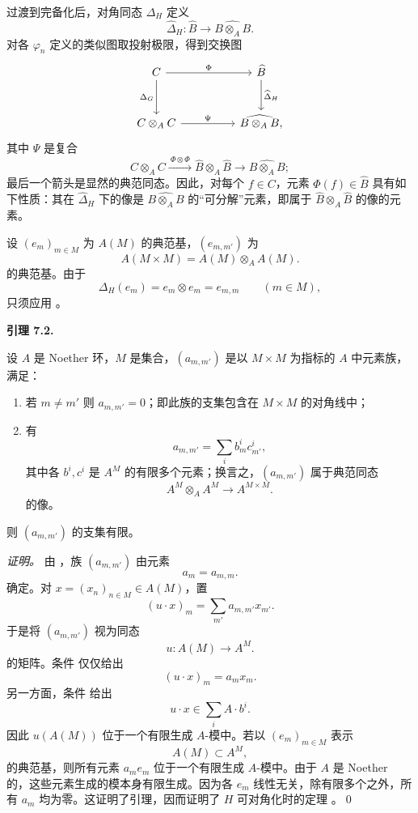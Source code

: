 过渡到完备化后，对角同态 \(\Delta_H\) 定义
\[
  \widehat\Delta_H:
  \widehat B\longrightarrow\widehat{B\otimes_AB}.
\]
对各 \(\varphi_n\) 定义的类似图取投射极限，得到交换图
\[
\begin{tikzcd}[column sep=huge,row sep=large]
  C
    \arrow[r,"\Phi"]
    \arrow[d,"\Delta_G"']
  & \widehat B
    \arrow[d,"\widehat\Delta_H"]
  \\
  C\otimes_A C
    \arrow[r,"\Psi"]
  & \widehat{B\otimes_A B},
\end{tikzcd}
\]
其中 \(\Psi\) 是复合
\[
  C\otimes_A C
  \xrightarrow{\ \Phi\otimes\Phi\ }
  \widehat B\otimes_A\widehat B
  \longrightarrow
  \widehat{B\otimes_A B};
\]
最后一个箭头是显然的典范同态。因此，对每个 \(f\in C\)，元素 \(\Phi(f)\in\widehat B\) 具有如下性质：其在 \(\widehat\Delta_H\) 下的像是 \(\widehat{B\otimes_A B}\) 的“可分解”元素，即属于
\(\widehat B\otimes_A\widehat B\)
的像的元素。

设 \((e_m)_{m\in M}\) 为 \(A(M)\) 的典范基，\((e_{m,m'})\) 为
\[
  A(M\times M)=A(M)\otimes_AA(M).
\]
的典范基。由于
\[
  \Delta_H(e_m)=e_m\otimes e_m=e_{m,m}
  \qquad (m\in M),
\]
只须应用 。

\medskip
\noindent{}\textbf{引理 7.2.}
\begin{itshape}
设 \(A\) 是 Noether 环，\(M\) 是集合，\((a_{m,m'})\) 是以 \(M\times M\) 为指标的 \(A\) 中元素族，满足：
\begin{enumerate}
  \item[(i)] 
  若 \(m\neq m'\) 则 \(a_{m,m'}=0\)；即此族的支集包含在 \(M\times M\) 的对角线中；

  \item[(ii)] 
  有
  \[
    a_{m,m'}=\sum_i b_m^ic_{m'}^i,
  \]
  其中各 \(b^i,c^i\) 是 \(A^M\) 的有限多个元素；换言之，\((a_{m,m'})\) 属于典范同态
  \[
    A^M\otimes_AA^M\longrightarrow A^{M\times M}.
  \]
  的像。
\end{enumerate}
则 \((a_{m,m'})\) 的支集有限。
\end{itshape}

\emph{证明。}
由 ，族 \((a_{m,m'})\) 由元素
\[
  a_m=a_{m,m}.
\]
确定。对 \(x=(x_n)_{n\in M}\in A(M)\)，置
\[
  (u\cdot x)_m=\sum_{m'}a_{m,m'}x_{m'}.
\]
于是将 \((a_{m,m'})\) 视为同态
\[
  u:A(M)\longrightarrow A^M.
\]
的矩阵。条件  仅仅给出
\[
  (u\cdot x)_m=a_mx_m.
\]
另一方面，条件  给出
\[
  u\cdot x\in\sum_i A\cdot b^i.
\]
因此 \(u(A(M))\) 位于一个有限生成 \(A\)-模中。若以 \((e_m)_{m\in M}\) 表示
\[
  A(M)\subset A^M,
\]
的典范基，则所有元素 \(a_me_m\) 位于一个有限生成 \(A\)-模中。由于 \(A\) 是 Noether 的，这些元素生成的模本身有限生成。因为各 \(e_m\) 线性无关，除有限多个之外，所有 \(a_m\) 均为零。这证明了引理，因而证明了 \(H\) 可对角化时的定理 。\qed


